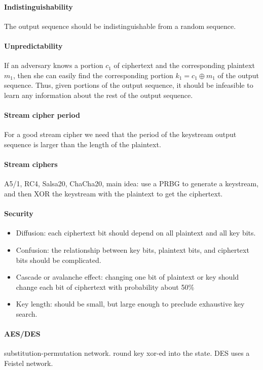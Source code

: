 \documentclass[11pt]{article}
\begin{document}
\paragraph{Indistinguishability} The output sequence should be indistinguishable from a random sequence.

\paragraph{Unpredictability} If an adversary knows a portion $c_1$ of ciphertext and the corresponding plaintext $m_1$, then she can easily find the corresponding portion $k_1 = c_1 \oplus m_1$ of the output sequence. Thus, given portions of the output sequence, it should be infeasible to learn any information about the rest of the output sequence.

\paragraph{Stream cipher period} For a good stream cipher we need that the period of the keystream output sequence is larger than the length of the plaintext.

\paragraph{Stream ciphers} A5/1, RC4, Salsa20, ChaCha20, main idea: use a PRBG to generate a keystream, and then XOR the keystream with the plaintext to get the ciphertext.

\paragraph{Security}
\begin{itemize}
    \item Diffusion: each ciphertext bit should depend on all plaintext and all key bits.
    \item Confusion: the relationship between key bits, plaintext bits, and ciphertext bits should be complicated.
    \item Cascade or avalanche effect: changing one bit of plaintext or key should change each bit of ciphertext with probability about 50\%
    \item Key length: should be small, but large enough to preclude exhaustive key search.
\end{itemize}


\paragraph{AES/DES} substitution-permutation network. round key xor-ed into the state. DES uses a Feistel network.
\end{document}
